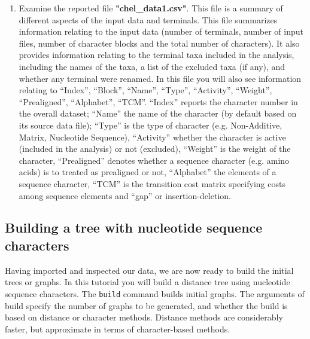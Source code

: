 \documentclass[11pt]{article}
\begin{document}
\begin{enumerate}
\item Examine the reported file \textbf{"chel\_data1.csv"}. This file is a summary 
of different aspects of the input data and terminals. This file summarizes 
information relating to the input data (number of terminals, number of input files, 
number of character blocks and the total number of characters). It also provides
information relating to the terminal taxa included in the analysis, including the 
names of the taxa, a list of the excluded taxa (if any), and whether any terminal 
were renamed. In this file you will also see information relating to 
``Index'', ``Block'', ``Name'', ``Type'', ``Activity'', ``Weight'', ``Prealigned'', ``Alphabet'', 
``TCM''. ``Index'' reports the character number in the overall dataset; ``Name'' the 
name of the character (by default based on its source data file); ``Type'' is the type 
of character (e.g. Non-Additive, Matrix, Nucleotide Sequence), ``Activity'' whether
the character is active (included in the analysis) or not (excluded), ``Weight'' is the 
weight of the character, ``Prealigned''  denotes whether a sequence character 
(e.g. amino acids) is to treated as prealigned or not, ``Alphabet'' the elements of 
a sequence character, ``TCM'' is the transition cost matrix specifying costs among 
sequence elements and ``gap'' or insertion-deletion.
\end{enumerate}

\subsection{Building a tree with nucleotide sequence characters}
\label{subsec:Building}

Having imported and inspected our data, we are now ready to build the initial trees 
or graphs. In this tutorial you will build a distance tree using nucleotide sequence 
characters. The \texttt{build} command builds initial graphs. The arguments of build 
specify the number of graphs to be generated, and whether the build is based on 
distance or character methods. Distance methods are considerably faster, but 
approximate in terms of character-based methods. 
\end{document}
